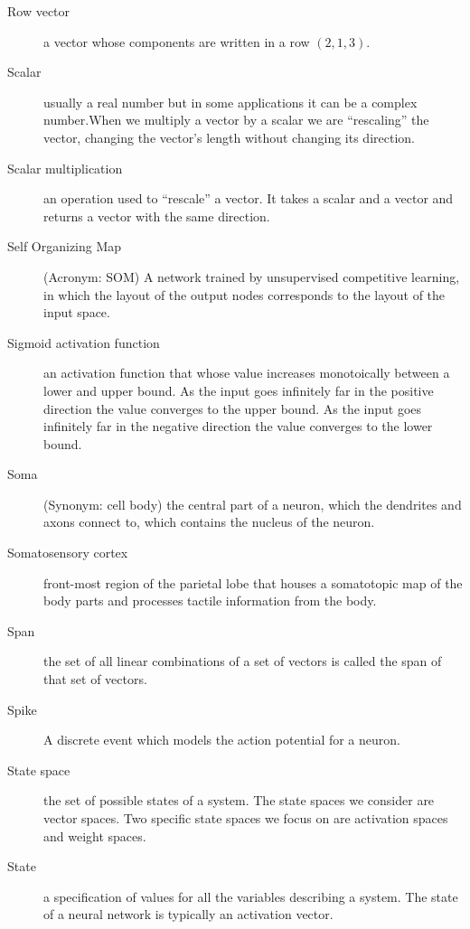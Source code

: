 \begin{description}
\item[Row vector] a vector whose components are written in a row \eg $(2,1,3)$.

\item[Scalar] usually a real number but in some applications it can be a complex number.When we multiply a vector by a scalar we are ``rescaling'' the vector, \ie changing the vector's length without changing its direction.

\item[Scalar multiplication] an operation used to ``rescale'' a vector. It takes a scalar and a vector and returns a vector with the same direction.

\item[Self Organizing Map] (Acronym: SOM)  A network trained by unsupervised competitive learning, in which the layout of the output nodes corresponds to the layout of the input space.

\item[Sigmoid activation function] an activation function that whose value increases  monotoically between a lower and upper bound. As the input goes infinitely far in the positive direction the value converges to the upper bound. As the input goes infinitely far in the negative direction the value converges to the lower bound.


\item[Soma] (Synonym: cell body) the central part of a neuron, which the dendrites and axons connect to, which contains the nucleus of the neuron.

\item[Somatosensory cortex] front-most region of the parietal lobe that houses a somatotopic map of the body parts and processes tactile information from the body.

\item[Span] the set of all linear combinations of a set of vectors is called the span of that set of vectors.

\item[Spike] A discrete event which models the action potential for a neuron.

\item[State space] the set of possible states of a system. The state spaces we consider are vector spaces. Two specific state spaces we focus on are activation spaces and weight spaces.

\item[State] a specification of values for all the variables describing a system. The state of a neural network is typically an activation vector.


\end{description}
